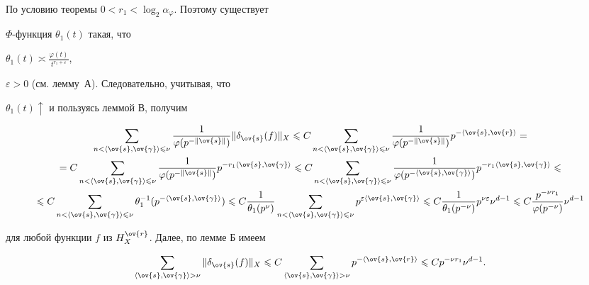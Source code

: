 По условию теоремы $0<r_{1}<\log_{2}\alpha_{\varphi}$. Поэтому существует 


$\Phi$-функция $\theta_{1}(t)$ такая, что


$\theta_{1}(t)\asymp\frac{\varphi(t)}{t^{r_{1}+\varepsilon}}$, 


$\varepsilon>0$ (см. лемму~А). Следовательно, учитывая, что 


$\theta_{1}(t)\uparrow$ и пользуясь леммой В, получим 


\begin{multline}


\sum_{n<\la\ov{s},\ov{\gamma}\ra\le\nu}


\frac{1}{\varphi(p^{-\|\ov{s}\|})}\|\delta_{\ov{s}}(f)\|_{X}


\le C\sum_{n<\la\ov{s},\ov{\gamma}\ra\le\nu}\frac{1}{\varphi(p^{-\|\ov{s}\|


})}p^{-\la\ov{s},\ov{r}\ra}= \\


%


=C\sum_{n< \la\ov{s},\ov{\gamma}\ra\le\nu}\frac{1}{\varphi(p^{-\|\ov{s}\|})} 


p^{-r_{1}\la\ov{s},\ov{\gamma}\ra}\le C\sum_{n< 


\la\ov{s},\ov{\gamma}\ra\le\nu}\frac{1}{\varphi(p^{-\la\ov{s},\ov{\gamma}\ra})} 


p^{-r_{1}\la\ov{s},\ov{\gamma}\ra}\le \\


%


\le C\sum_{n< \la\ov{s},\ov{\gamma}\ra\le\nu}\theta_{1}^{-1}(p^{-\la\ov{s},\ov


{\gamma}\ra})\le 


C\frac{1}{\theta_{1}(p^{\nu})}\sum_{n< \la\ov{s},\ov{\gamma}\ra\le\nu}p^{


\varepsilon\la\ov{s},\ov{\gamma}\ra}\le C\frac{1}{\theta_{1}(p^{-\nu})}p^{\nu


\varepsilon}\nu^{d-1}\le


C\frac{p^{-\nu r_{1}}}{\varphi(p^{-\nu})}\nu^{d-1}


\end{multline}


для любой функции $f$ из $H_{X}^{\ov{r}}$. Далее, по лемме Б имеем


\begin{equation}


\sum_{\la\ov{s},\ov{\gamma}\ra >\nu}\|\delta_{\ov{s}}(f)\|_{X}\le C\sum_{\la\ov


{s},\ov{\gamma}\ra >\nu}p^{-\la\ov{s},\ov{r}\ra}\le Cp^{-\nu 


r_{1}}\nu^{d-1}.


\end{equation}  


